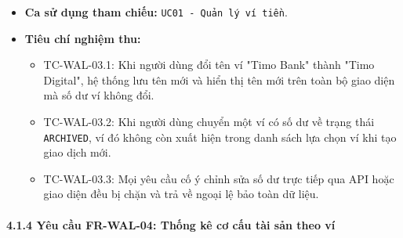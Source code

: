 \documentclass[11pt,a4paper]{article}
\providecommand{\tightlist}{
  \setlength{\itemsep}{0pt}\setlength{\parskip}{0pt}}
\begin{document}
\begin{itemize}
  \begin{itemize}
  \tightlist
  \item
    Thông tin ví được cập nhật thành công trong hệ thống.
  \item
    Thông báo kết quả cập nhật hiển thị cho người dùng.
  \end{itemize}
\item
  \textbf{Ca sử dụng tham chiếu:} \texttt{UC01\ -\ Quản\ lý\ ví\ tiền}.
\item
  \textbf{Tiêu chí nghiệm thu:}

  \begin{itemize}
  \tightlist
  \item
    TC-WAL-03.1: Khi người dùng đổi tên ví "Timo Bank" thành "Timo
    Digital", hệ thống lưu tên mới và hiển thị tên mới trên toàn bộ giao
    diện mà số dư ví không đổi.
  \item
    TC-WAL-03.2: Khi người dùng chuyển một ví có số dư về trạng thái
    \texttt{ARCHIVED}, ví đó không còn xuất hiện trong danh sách lựa
    chọn ví khi tạo giao dịch mới.
  \item
    TC-WAL-03.3: Mọi yêu cầu cố ý chỉnh sửa số dư trực tiếp qua API hoặc
    giao diện đều bị chặn và trả về ngoại lệ bảo toàn dữ liệu.
  \end{itemize}
\end{itemize}

\newpage

\paragraph{4.1.4 Yêu cầu FR-WAL-04: Thống kê cơ cấu tài sản theo
ví}\label{414-yuxeau-cux1ea7u-fr-wal-04-thux1ed1ng-kuxea-cux1a1-cux1ea5u-tuxe0i-sux1ea3n-theo-vuxed}
\end{document}
